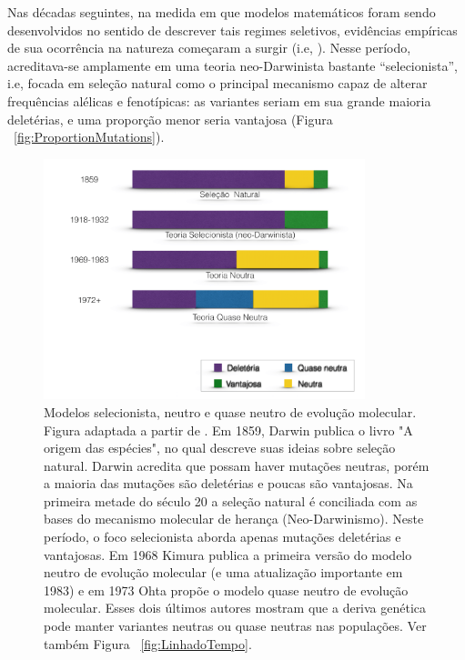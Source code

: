 \begin{refsection}
    Nas décadas seguintes, na medida em que modelos matemáticos foram sendo desenvolvidos no sentido de descrever tais regimes seletivos, evidências empíricas de sua ocorrência na natureza começaram a surgir (i.e,  \cite{Allison1954}). Nesse período, acreditava-se amplamente em uma teoria neo-Darwinista bastante \enquote{selecionista}, i.e, focada em seleção natural como o principal mecanismo capaz de alterar frequências alélicas e fenotípicas: as variantes seriam em sua grande maioria deletérias, e uma proporção menor seria vantajosa (Figura ~\ref{fig:ProportionMutations}). 




\begin{figure}[h]
\centering
\includegraphics[height=7cm,keepaspectratio]{chap1_folder/Figures/proportion_mutations.png}
\caption{Modelos selecionista, neutro e quase neutro de evolução molecular. Figura adaptada a partir de \textcite{Bromham2003,Bernardi2007}. Em 1859, Darwin publica o livro "A origem das espécies", no qual descreve suas ideias sobre seleção natural\nocite{Darwin1979}. Darwin acredita que possam haver mutações neutras,  porém a maioria das mutações são deletérias e poucas são vantajosas. Na primeira metade do século 20 a seleção natural é conciliada com as bases do mecanismo molecular de herança (Neo-Darwinismo). Neste período, o foco selecionista aborda apenas mutações deletérias e vantajosas. Em 1968 Kimura publica a primeira versão do modelo neutro de evolução molecular (e uma atualização importante em 1983) e em 1973 Ohta \nocite{Ohta1973SlightlyEvolution} propõe o modelo quase neutro de evolução molecular. Esses dois últimos autores mostram que a deriva genética pode manter variantes neutras ou quase neutras nas populações. Ver também Figura ~\ref{fig:LinhadoTempo}.} 

\end{figure}
\end{refsection}
